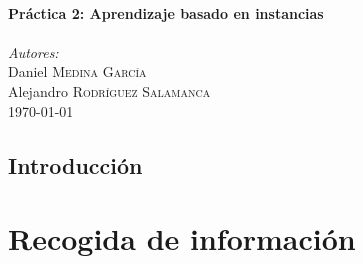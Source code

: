 \documentclass[12pt]{article}
\begin{document}
\begin{titlepage}
\HRule \\[0.7cm]
{ \huge \bfseries Práctica 2: Aprendizaje basado en instancias}\\[0.4cm] %
\HRule \\[0.7cm]


\emph{Autores:}\\
Daniel \textsc{Medina García}\\ %
Alejandro \textsc{Rodríguez Salamanca}\\[1.1cm] %


{\large \today}\\ %


\vfill %

\end{titlepage}

\tableofcontents

\newpage
\thispagestyle{empty}
\clearpage
\vspace*{\fill}
\begin{center}
    \begin{minipage}{\textwidth}
        \begin{center}
            \section*{Introducción}
        \end{center}
    \end{minipage}
\end{center}
\vfill

\newpage
\section{Recogida de información}

\end{document}
